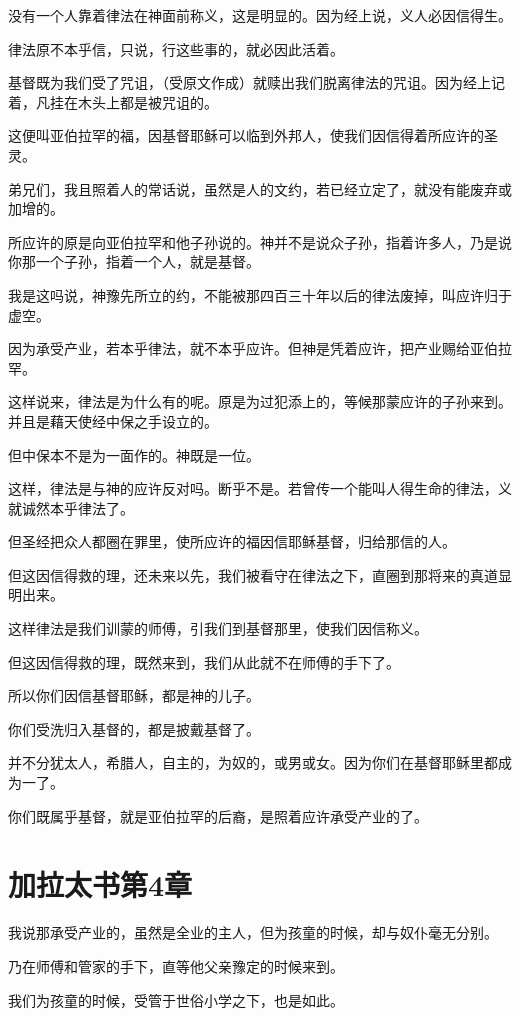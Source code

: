 \documentclass[12pt,oneside]{book}
\begin{document}
没有一个人靠着律法在神面前称义，这是明显的。因为经上说，义人必因信得生。

律法原不本乎信，只说，行这些事的，就必因此活着。

基督既为我们受了咒诅，（受原文作成）就赎出我们脱离律法的咒诅。因为经上记着，凡挂在木头上都是被咒诅的。

这便叫亚伯拉罕的福，因基督耶稣可以临到外邦人，使我们因信得着所应许的圣灵。

弟兄们，我且照着人的常话说，虽然是人的文约，若已经立定了，就没有能废弃或加增的。

所应许的原是向亚伯拉罕和他子孙说的。神并不是说众子孙，指着许多人，乃是说你那一个子孙，指着一个人，就是基督。

我是这吗说，神豫先所立的约，不能被那四百三十年以后的律法废掉，叫应许归于虚空。

因为承受产业，若本乎律法，就不本乎应许。但神是凭着应许，把产业赐给亚伯拉罕。

这样说来，律法是为什么有的呢。原是为过犯添上的，等候那蒙应许的子孙来到。并且是藉天使经中保之手设立的。

但中保本不是为一面作的。神既是一位。

这样，律法是与神的应许反对吗。断乎不是。若曾传一个能叫人得生命的律法，义就诚然本乎律法了。

但圣经把众人都圈在罪里，使所应许的福因信耶稣基督，归给那信的人。

但这因信得救的理，还未来以先，我们被看守在律法之下，直圈到那将来的真道显明出来。

这样律法是我们训蒙的师傅，引我们到基督那里，使我们因信称义。

但这因信得救的理，既然来到，我们从此就不在师傅的手下了。

所以你们因信基督耶稣，都是神的儿子。

你们受洗归入基督的，都是披戴基督了。

并不分犹太人，希腊人，自主的，为奴的，或男或女。因为你们在基督耶稣里都成为一了。

你们既属乎基督，就是亚伯拉罕的后裔，是照着应许承受产业的了。

\chapter{加拉太书第4章}
我说那承受产业的，虽然是全业的主人，但为孩童的时候，却与奴仆毫无分别。

乃在师傅和管家的手下，直等他父亲豫定的时候来到。

我们为孩童的时候，受管于世俗小学之下，也是如此。
\end{document}
